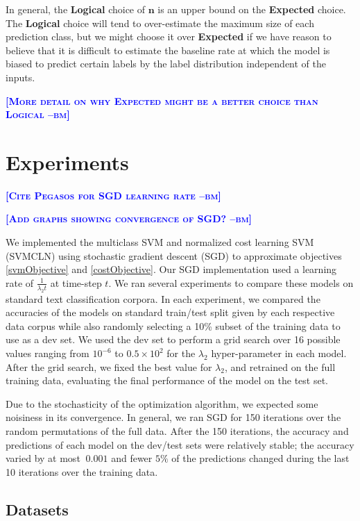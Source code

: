 \documentclass{article} %
\newcommand{\bmcomment}[1]{\textcolor{blue}{\textsc{\textbf{[#1 --bm]}}}}
\begin{document}
In general, the \textbf{Logical} choice of $\mathbf{n}$ is an upper
bound on the \textbf{Expected} choice.  The \textbf{Logical} choice
will tend to over-estimate the maximum size of each prediction class,
but we might choose it over \textbf{Expected} if we have reason
to believe that it is difficult to estimate the baseline rate at
which the model is biased to predict certain labels by the label
distribution independent of the inputs.

\bmcomment{More detail on why Expected might be a better 
choice than Logical}

\section{Experiments}

\bmcomment{Cite Pegasos for SGD learning rate}

\bmcomment{Add graphs showing convergence of SGD?}

We implemented the multiclass SVM and normalized cost learning SVM (SVMCLN) 
using stochastic gradient descent (SGD) to approximate objectives
\ref{svmObjective} and \ref{costObjective}.  Our SGD implementation
used a learning rate of $\frac{1}{\lambda_2 t}$ at time-step $t$.
We ran several experiments to compare these models on standard
text classification corpora.  In each experiment, we compared 
the accuracies of the models on standard train/test split 
given by each respective
data corpus while also randomly selecting a 10\% subset of the 
training data to use as a dev set.  We used the dev set to perform
a grid search over 16 possible values ranging from $10^{-6}$ to 
$0.5\times 10^2$ for the $\lambda_2$ hyper-parameter in each model.
After the grid search, we fixed the best value for $\lambda_2$,
and retrained on the full training data,
evaluating the final performance of the model on the test set.  
 
Due to the stochasticity of the optimization algorithm, we 
expected some noisiness in its convergence.  In general, we 
ran SGD for 150 iterations over the random permutations
of the full data. After the 150 iterations, the accuracy and 
predictions of each model on the dev/test sets were relatively 
stable; the accuracy varied by at most $~0.001$ and 
fewer $5\%$ of the predictions changed 
during the last 10 iterations over the training 
data. 

\subsection{Datasets}
\end{document}
